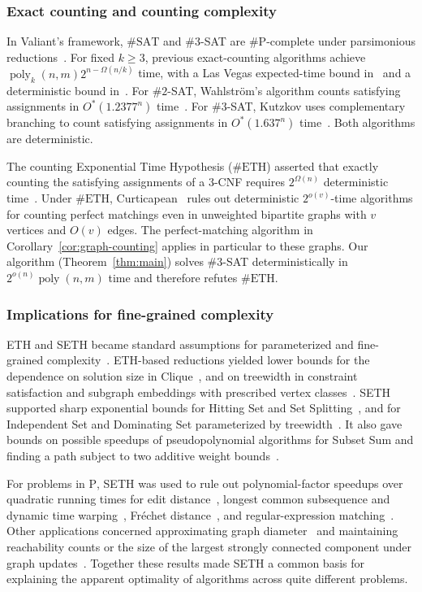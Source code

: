 \documentclass[11pt,reqno]{amsart}
\numberwithin{equation}{section}
\theoremstyle{definition}\newtheorem{definition}[theorem]{Definition}
\theoremstyle{remark}\newtheorem{remark}[theorem]{Remark}
\newcommand{\poly}{\operatorname{poly}}
\renewcommand{\ge}{\geqslant}
\begin{document}
\subsubsection{Exact counting and counting complexity}\label{subsec:related-counting}
In Valiant's framework, $\#\mathrm{SAT}$ and $\#3$-SAT are
$\#\mathrm P$-complete under parsimonious
reductions~\cite[Section~3, Facts~1--2]{Val79}.
For fixed $k\ge3$, previous exact-counting algorithms achieve
$\poly_k(n,m)2^{n-\Omega(n/k)}$ time, with a Las Vegas
expected-time bound in~\cite[Lemma~3.5]{IMP12} and a deterministic
bound in~\cite[Theorem~1.6]{CW21}.
For $\#2$-SAT, Wahlstr\"om's algorithm counts satisfying assignments
in $O^*(1.2377^n)$ time~\cite{Wahlstrom08}. For $\#3$-SAT, Kutzkov
uses complementary branching to count satisfying assignments in
$O^*(1.637^n)$ time~\cite{Kutzkov26}. Both algorithms are deterministic.

The counting Exponential Time Hypothesis ($\#\mathrm{ETH}$)
asserted that exactly counting the satisfying assignments of a $3$-CNF
requires $2^{\Omega(n)}$ deterministic time~\cite[Section~1]{DHMTW}.
Under $\#\mathrm{ETH}$, Curticapean~\cite{Cur18} rules out deterministic
$2^{o(v)}$-time algorithms for counting perfect matchings even in
unweighted bipartite graphs with $v$ vertices and $O(v)$ edges.
The perfect-matching algorithm in Corollary~\ref{cor:graph-counting}
applies in particular to these graphs.
Our algorithm (Theorem~\ref{thm:main}) solves $\#3$-SAT deterministically
in $2^{o(n)}\poly(n,m)$ time and therefore refutes $\#\mathrm{ETH}$.

\subsubsection{Implications for fine-grained complexity}\label{subsec:related-consequences}
ETH and SETH became standard assumptions for parameterized and
fine-grained complexity~\cite{IPZ,VW19}.
ETH-based reductions yielded lower bounds for the dependence on
solution size in Clique~\cite{CHKX06}, and on treewidth in constraint
satisfaction and subgraph embeddings with prescribed vertex classes~\cite{Marx10}.
SETH supported sharp exponential bounds for Hitting Set and Set
Splitting~\cite{CDL16}, and for Independent Set and Dominating Set
parameterized by treewidth~\cite{LMS18}.
It also gave bounds on possible speedups of pseudopolynomial algorithms
for Subset Sum and finding a path subject to two additive weight bounds~\cite{ABHS19}.

For problems in $\mathrm P$, SETH was used to rule out polynomial-factor
speedups over quadratic running times for edit
distance~\cite{BackursIndyk18}, longest common subsequence and dynamic
time warping~\cite{BK15}, Fr\'echet distance~\cite{Bri14}, and
regular-expression matching~\cite{BI16}.
Other applications concerned approximating graph
diameter~\cite{RV13} and maintaining reachability counts or the size
of the largest strongly connected component under graph
updates~\cite{AW14}.
Together these results made SETH a common basis for explaining the
apparent optimality of algorithms across quite different problems.
\end{document}
